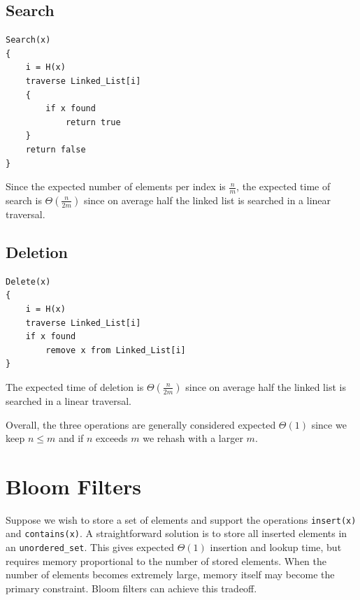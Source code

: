 \subsection{Search}

\begin{center}
\begin{minipage}{0.9\linewidth}
\begin{framed}
\begin{Verbatim}
Search(x)
{
    i = H(x)
    traverse Linked_List[i]
    {
        if x found
            return true
    }
    return false
}
\end{Verbatim}
\vspace{-4mm}
\end{framed}
\end{minipage}
\end{center}

Since the expected number of elements per index is $\frac{n}{m}$, the 
expected time of search is $\Theta(\frac{n}{2m})$ since on average half the 
linked list is searched in a linear traversal.

\subsection{Deletion}
\begin{center}
\begin{minipage}{0.9\linewidth}
\begin{framed}
\begin{Verbatim}
Delete(x)
{
    i = H(x)
    traverse Linked_List[i]
    if x found
        remove x from Linked_List[i]
}
\end{Verbatim}
\vspace{-4mm}
\end{framed}
\end{minipage}
\end{center}

The expected time of deletion is $\Theta(\frac{n}{2m})$ since on 
average half the linked list is searched in a linear traversal.

Overall, the three operations are generally considered expected $\Theta(1)$ since we keep $n \le m$ and if 
$n$ exceeds $m$ we rehash with a larger $m$.

\section{Bloom Filters}

Suppose we wish to store a set of elements and support the operations 
\texttt{insert(x)} and \texttt{contains(x)}.
A straightforward solution is to store all inserted elements in an \texttt{unordered\_set}.
This gives expected $\Theta(1)$ insertion and lookup time, but requires memory proportional 
to the number of stored elements. When the number of elements becomes 
extremely large, memory itself may become the primary constraint. Bloom filters can achieve this tradeoff.

